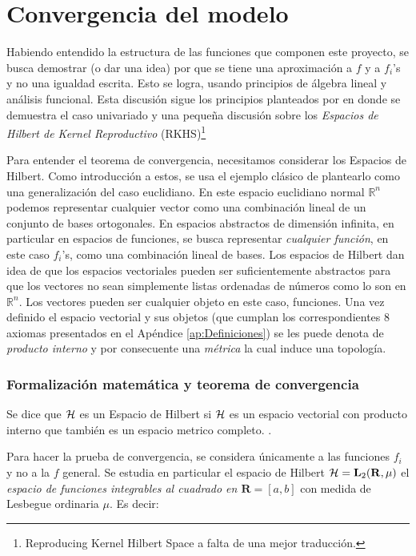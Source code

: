 \documentclass[../../Main/Main.tex]{subfiles}
\begin{document}
\section{Convergencia del modelo} \label{sec:Convergencia}

Habiendo entendido la estructura de las funciones que componen este proyecto, se busca demostrar (o dar una idea) por que se tiene una aproximación a $f$ y a $f_i$'s y no una igualdad escrita. Esto se logra, usando principios de álgebra lineal y análisis funcional. Esta discusión sigue los principios planteados por \autocite{bergstrom1985estimation} en donde se demuestra el caso univariado y una pequeña discusión sobre los  \textit{Espacios de Hilbert de Kernel Reproductivo} (RKHS)\footnote{Reproducing Kernel Hilbert Space a falta de una mejor traducción.} 

Para entender el teorema de convergencia, necesitamos considerar los Espacios de Hilbert. Como introducción a estos, se usa el ejemplo clásico de plantearlo como una generalización del caso euclidiano. En este espacio euclidiano normal $\mathbb{R}^n$ podemos representar cualquier vector como una combinación lineal de un conjunto de bases ortogonales.  En espacios abstractos de dimensión infinita, en particular en espacios de funciones, se busca representar \textit{cualquier función}, en este caso $f_i$'s, como una combinación lineal de bases. Los espacios de Hilbert dan idea de que los espacios vectoriales pueden ser suficientemente abstractos para que los vectores no sean simplemente listas ordenadas de números como lo son en $\mathbb{R}^n$. Los vectores pueden ser cualquier objeto en este caso, funciones. Una vez definido el espacio vectorial y sus objetos (que cumplan los correspondientes 8 axiomas presentados en el Apéndice \ref{ap:Definiciones}) se les puede denota de \textit{producto interno} y por consecuente una \textit{métrica} la cual induce una topología.

\subsubsection{Formalización matemática y teorema de convergencia}

Se dice que $\mathcal{H}$ es un Espacio de Hilbert si $\mathcal{H}$ es un espacio vectorial con producto interno que también es un espacio metrico completo. \autocite{rudin1987real}.

Para hacer la prueba de convergencia, se considera únicamente a las funciones $f_i$ y no a la $f$ general. Se estudia en particular el espacio de Hilbert $\mathcal{H} = \mathbf{L}_2(\mathbf{R},\mu)$ el \textit{espacio de funciones integrables al cuadrado en $\mathbf{R} = [a,b]$} con medida de Lesbegue ordinaria $\mu$. Es decir: 
\end{document}
